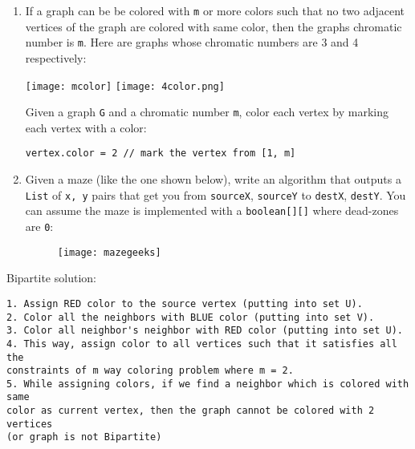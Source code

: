 \documentclass{article}
\begin{document}
\begin{enumerate}
\item If a graph can be be colored with \texttt{m} or more colors such that no two adjacent vertices of the graph are colored with same color, then the graphs chromatic number is \texttt{m}. Here are graphs whose chromatic numbers are 3 and 4 respectively:
\begin{center}
\texttt{[image: mcolor]}
\texttt{[image: 4color.png]}
\end{center}

Given a graph \texttt{G} and a chromatic number \texttt{m}, color each vertex by marking each vertex with a color:

\texttt{vertex.color = 2 // mark the vertex from [1, m]}

\item Given a maze (like the one shown below), write an algorithm that outputs a \texttt{List} of \texttt{x, y} pairs that get you from \texttt{sourceX}, \texttt{sourceY} to \texttt{destX}, \texttt{destY}. You can assume the maze is implemented with a \texttt{boolean[][]} where dead-zones are \texttt{0}:


\begin{figure}[h]
\centering
\texttt{[image: mazegeeks]}
\end{figure}


\end{enumerate}

\pagebreak

Bipartite solution:
\begin{lstlisting}
1. Assign RED color to the source vertex (putting into set U).
2. Color all the neighbors with BLUE color (putting into set V).
3. Color all neighbor's neighbor with RED color (putting into set U).
4. This way, assign color to all vertices such that it satisfies all the
constraints of m way coloring problem where m = 2.
5. While assigning colors, if we find a neighbor which is colored with same
color as current vertex, then the graph cannot be colored with 2 vertices
(or graph is not Bipartite)
\end{lstlisting}
\end{document}
